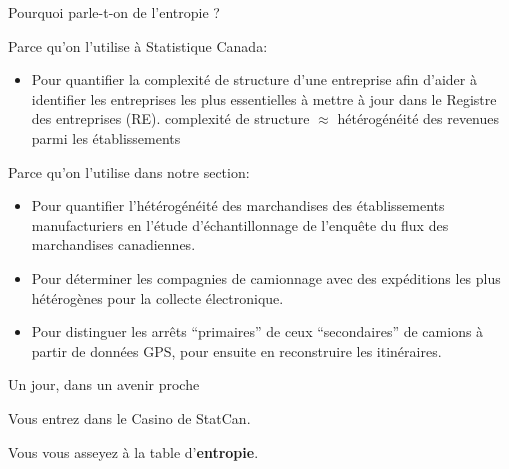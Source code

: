 \begin{frame}{\LARGE Pourquoi parle-t-on de l'entropie ?}

\vskip 0.3cm

\footnotesize
\pause
{\large Parce qu'on l'utilise \`a Statistique Canada:}
\begin{itemize}
\pause
\item
	Pour quantifier la {\color{customRed}complexit\'e de structure} d'une entreprise
	\pause afin d'aider \`a identifier les entreprises les plus essentielles
	\`a mettre \`a jour dans le {\color{gcblue}Registre des entreprises} (RE).
	\pause\vskip -0.075cm
	{\scriptsize\color{gray}
	complexit\'e de structure $\approx$
	h\'et\'erog\'en\'eit\'e des revenues parmi les \'etablissements}
\end{itemize}

\vskip 0.5cm
\pause
{\large Parce qu'on l'utilise dans notre section:}
\begin{itemize}
\pause
\item\vskip 0.1cm
	Pour quantifier l'{\color{customRed}h\'et\'erog\'en\'eit\'e des marchandises}
	des \'etablissements manufacturiers
	en l'\'etude d'\'echantillonnage de l'{\color{gcblue}enqu\^ete du flux des marchandises canadiennes}.
\pause
\item
	Pour d\'eterminer les compagnies de camionnage
	avec des {\color{customRed}exp\'editions} les plus h\'et\'erog\`enes
	pour la {\color{gcblue}collecte \'electronique}.
\pause
\item\vskip 0.1cm
	Pour distinguer les {\color{customRed}arr\^ets} ``primaires'' de ceux ``secondaires''
	de camions \`a partir de donn\'ees GPS, pour ensuite en reconstruire les {\color{gcblue}itin\'eraires}.
\end{itemize}

\normalsize
\end{frame}


\begin{frame}{\huge Un jour, dans un avenir proche}

\LARGE

\pause Vous entrez dans le Casino \pause de StatCan.
\vskip -0.25cm

\vskip 1.5cm
\pause Vous vous asseyez \`a la table d'\textbf{\huge entropie}.

\normalsize
\end{frame}

